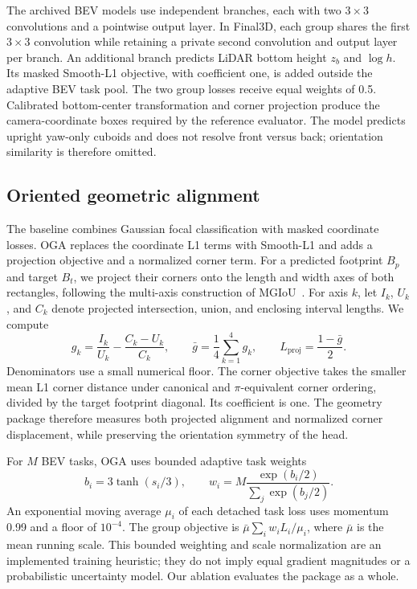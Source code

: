 The archived BEV models use independent branches, each with two $3\times3$ convolutions and a pointwise output layer. In Final3D, each group shares the first $3\times3$ convolution while retaining a private second convolution and output layer per branch. An additional branch predicts LiDAR bottom height $z_b$ and $\log h$. Its masked Smooth-L1 objective, with coefficient one, is added outside the adaptive BEV task pool. The two group losses receive equal weights of 0.5. Calibrated bottom-center transformation and corner projection produce the camera-coordinate boxes required by the reference evaluator. The model predicts upright yaw-only cuboids and does not resolve front versus back; orientation similarity is therefore omitted.

\subsection{Oriented geometric alignment}
\label{sec:oga}
The baseline combines Gaussian focal classification with masked coordinate losses. OGA replaces the coordinate L1 terms with Smooth-L1 and adds a projection objective and a normalized corner term. For a predicted footprint $B_p$ and target $B_t$, we project their corners onto the length and width axes of both rectangles, following the multi-axis construction of MGIoU~\cite{le2026mgiou}. For axis $k$, let $I_k$, $U_k$, and $C_k$ denote projected intersection, union, and enclosing interval lengths. We compute
\begin{equation}
 g_k=\frac{I_k}{U_k}-\frac{C_k-U_k}{C_k},\qquad
 \bar g=\frac14\sum_{k=1}^{4}g_k,\qquad
 L_{\mathrm{proj}}=\frac{1-\bar g}{2}.
\end{equation}
Denominators use a small numerical floor. The corner objective takes the smaller mean L1 corner distance under canonical and $\pi$-equivalent corner ordering, divided by the target footprint diagonal. Its coefficient is one. The geometry package therefore measures both projected alignment and normalized corner displacement, while preserving the orientation symmetry of the head.

For $M$ BEV tasks, OGA uses bounded adaptive task weights
\begin{equation}
 b_i=3\tanh(s_i/3),\qquad
 w_i=M\frac{\exp(b_i/2)}{\sum_j\exp(b_j/2)}.
\end{equation}
An exponential moving average $\mu_i$ of each detached task loss uses momentum 0.99 and a floor of $10^{-4}$. The group objective is $\bar\mu\sum_i w_iL_i/\mu_i$, where $\bar\mu$ is the mean running scale. This bounded weighting and scale normalization are an implemented training heuristic; they do not imply equal gradient magnitudes or a probabilistic uncertainty model. Our ablation evaluates the package as a whole.

